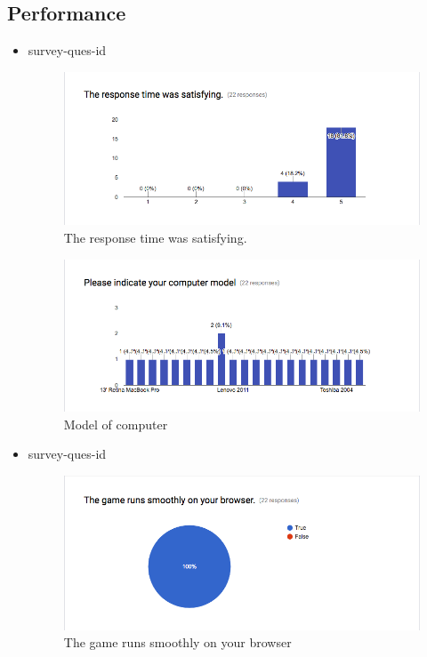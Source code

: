 \documentclass[12pt, titlepage]{article}
\newcounter{USnum}
\newcommand{\ttheUSnum}{survey-ques-id \theUSnum}
\begin{document}
\subsection{Performance}
\begin{itemize}

\item {\ttheUSnum \label{USq4}\\}

\begin{figure}[H]
\centering
\includegraphics[width=0.9\linewidth]{../../ReferenceMaterial/Survey_Results/Survey_Question_4}
\caption{The response time was satisfying. }
\end{figure}

\begin{figure}[H]
\centering
\includegraphics[width=0.9\linewidth]{../../ReferenceMaterial/Survey_Results/Survey_Question_8}
\caption{Model of computer}
\end{figure}
\newpage
\item {\ttheUSnum \label{USq6}\\}

\begin{figure}[H]
\centering
\includegraphics[width=0.9\linewidth]{../../ReferenceMaterial/Survey_Results/Survey_Question_6}
\caption{The game runs smoothly on your browser}
\end{figure}


\end{itemize}
\end{document}
